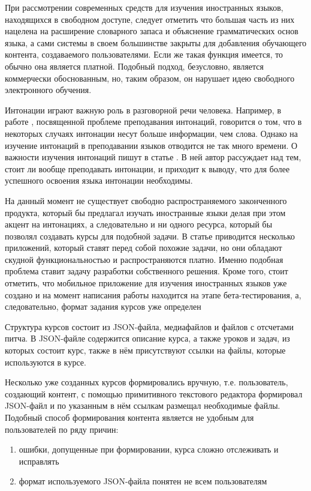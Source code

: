 \documentclass[%
  a5paper,
  subf,
  href,
  master,
  dotsinheaders 
]{csse-fcs}
\begin{document}
При рассмотрении современных средств для изучения иностранных языков, находящихся в свободном доступе, следует отметить что большая часть из них нацелена на расширение словарного запаса и объяснение грамматических основ языка, а сами системы в своем большинстве закрыты для добавления обучающего контента, создаваемого пользователями. Если же такая функция имеется, то обычно она является платной. Подобный подход, безусловно, является коммерчески обоснованным, но, таким образом, он нарушает идею свободного электронного обучения.

Интонации  играют важную роль в разговорной речи человека. Например, в работе \cite{luciasvalls}, посвященной проблеме преподавания интонаций, говорится о том, что в некоторых случаях интонации несут больше информации, чем слова. Однако на изучение интонаций в преподавании языков отводится не так много времени. О важности изучения интонаций пишут в статье \cite{taskdiscourse}. В ней автор рассуждает над тем, стоит ли вообще преподавать интонации, и приходит к выводу, что для более успешного освоения языка интонации необходимы.

На данный момент не существует свободно распространяемого законченного продукта, который бы предлагал изучать иностранные языки делая при этом акцент на интонациях, а следовательно и ни одного ресурса, который бы позволял создавать курсы для подобной задачи. В статье \cite{pennington2019using} приводится несколько приложений, который ставят перед собой похожие задачи, но они обладают скудной функциональностью и распространяются платно. Именно подобная проблема ставит задачу разработки собственного решения. Кроме того, стоит отметить, что мобильное приложение для изучения иностранных языков уже создано и на момент написания работы находится на этапе бета-тестирования, а, следовательно, формат задания курсов уже определен

Структура курсов состоит из JSON-файла, медиафайлов и файлов с отсчетами питча.
В JSON-файле содержится описание курса, а также уроков и задач, из которых состоит курс, также в нём присутствуют ссылки на файлы, которые используются в курсе.

Несколько уже созданных курсов формировались вручную, т.е. пользователь, создающий контент, с помощью примитивного текстового редактора формировал JSON-файл и по указанным в нём ссылкам размещал необходимые файлы. Подобный способ формирования контента является не удобным для пользователей по ряду причин: 

\begin{enumerate}
  \item ошибки, допущенные при формировании, курса сложно отслеживать и исправлять
  \item формат используемого JSON-файла понятен не всем пользователям
\end{enumerate}
\end{document}
